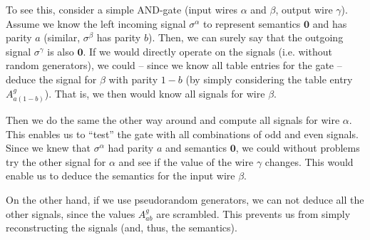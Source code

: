 \message{ !name(seminar.tex)}\documentclass{llncs}
\begin{document}
To see this, consider a simple AND-gate (input wires $\alpha$ and $\beta$, output wire $\gamma$). Assume we know the left incoming signal $\sigma^\alpha$ to represent semantics $\mathbf{0}$ and has parity $a$ (similar, $\sigma^\beta$ has parity $b$). Then, we can surely say that the outgoing signal $\sigma^\gamma$ is also $\mathbf{0}$. If we would directly operate on the signals (i.e. without random generators), we could -- since we know all table entries for the gate -- deduce the signal for $\beta$ with parity $1-b$ (by simply considering the table entry $A^g_{a(1-b)}$). That is, we then would know all signals for wire $\beta$.

Then we do the same the other way around and compute all signals for wire $\alpha$. This enables us to ``test'' the gate with all combinations of odd and even signals. Since we knew that $\sigma^\alpha$ had parity $a$ and semantics $\mathbf{0}$, we could without problems try the other signal for $\alpha$ and see if the value of the wire $\gamma$ changes. This would enable us to deduce the semantics for the input wire $\beta$.

On the other hand, if we use pseudorandom generators, we can not deduce all the other signals, since the values $A^g_{ab}$ are scrambled. This prevents us from simply reconstructing the signals (and, thus, the semantics).





\end{document}
